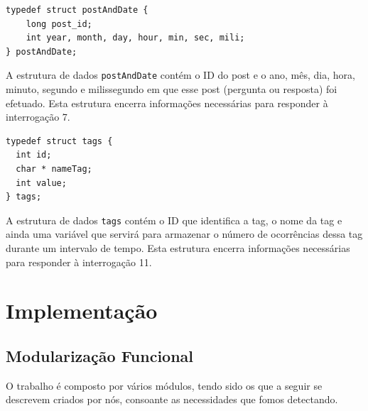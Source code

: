 \documentclass[a4paper]{article}
\begin{document}
\begin{verbatim}
typedef struct postAndDate {
    long post_id;
    int year, month, day, hour, min, sec, mili;
} postAndDate;
\end{verbatim}

A estrutura de dados \texttt{postAndDate} contém o ID do post e o ano, mês, dia,
hora, minuto, segundo e milissegundo em que esse post
(pergunta ou resposta) foi efetuado. Esta estrutura encerra informações
necessárias para responder à interrogação 7.

\begin{verbatim}
typedef struct tags {
  int id;
  char * nameTag;
  int value;
} tags;
\end{verbatim}

A estrutura de dados \texttt{tags} contém o ID que identifica a tag,
o nome da tag e ainda uma variável que servirá para armazenar
o número de ocorrências dessa tag durante um intervalo de tempo.
Esta estrutura encerra informações necessárias para responder à interrogação 11.


\section{Implementação}
\label{sec:implementacao}

\subsection{Modularização Funcional}
\label{sec:organizacao}

O trabalho é composto por vários módulos, tendo sido os que a seguir se descrevem
criados por nós, consoante as necessidades que fomos detectando.
\end{document}

